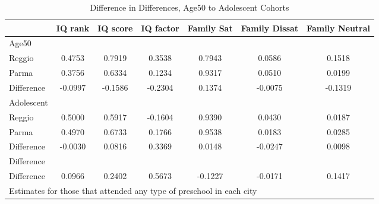 \begin{table}[htbp]\centering
\caption{Difference in Differences, Age50 to Adolescent Cohorts}
\begin{tabular}{l*{6}{c}}
\hline\hline
            &     IQ rank&    IQ score&   IQ factor&  Family Sat&Family Dissat&Family Neutral\\
\hline
Age50       &            &            &            &            &            &            \\
Reggio      &      0.4753&      0.7919&      0.3538&      0.7943&      0.0586&      0.1518\\
Parma       &      0.3756&      0.6334&      0.1234&      0.9317&      0.0510&      0.0199\\
Difference  &     -0.0997&     -0.1586&     -0.2304&      0.1374&     -0.0075&     -0.1319\\
\hline
Adolescent  &            &            &            &            &            &            \\
Reggio      &      0.5000&      0.5917&     -0.1604&      0.9390&      0.0430&      0.0187\\
Parma       &      0.4970&      0.6733&      0.1766&      0.9538&      0.0183&      0.0285\\
Difference  &     -0.0030&      0.0816&      0.3369&      0.0148&     -0.0247&      0.0098\\
\hline
Difference  &            &            &            &            &            &            \\
Difference  &      0.0966&      0.2402&      0.5673&     -0.1227&     -0.0171&      0.1417\\
\hline\hline
\multicolumn{7}{l}{\footnotesize Estimates for those that attended any type of preschool in each city}\\
\end{tabular}
\end{table}
